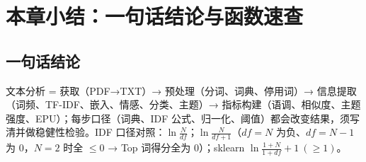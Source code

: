 \section{本章小结：一句话结论与函数速查}

\subsection{一句话结论}
文本分析 = 获取（PDF→TXT）→ 预处理（分词、词典、停用词）→ 信息提取（词频、TF-IDF、嵌入、情感、分类、主题）→ 指标构建（语调、相似度、主题强度、EPU）；每步口径（词典、IDF 公式、归一化、阈值）都会改变结果，须写清并做稳健性检验。IDF 口径对照：$\ln\frac{N}{df}$；$\ln\frac{N}{df+1}$（$df=N$ 为负、$df=N-1$ 为 0，$N=2$ 时全 $\le0$ → Top 词得分全为 0）；sklearn $\ln\frac{1+N}{1+df}+1\ (\ge1)$。

